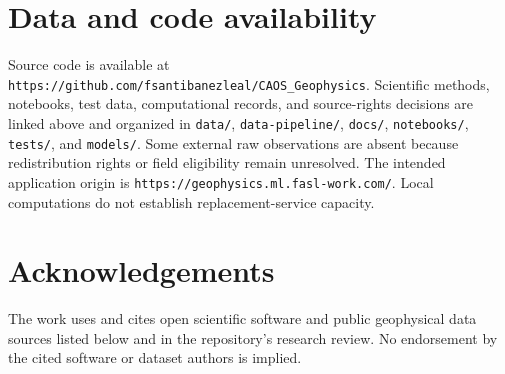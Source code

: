 \section{Data and code availability}\label{data-and-code-availability}

Source code is available at
\texttt{https://github.com/fsantibanezleal/CAOS\_Geophysics}. Scientific
methods, notebooks, test data, computational records, and source-rights
decisions are linked above and organized in \texttt{data/},
\texttt{data-pipeline/}, \texttt{docs/}, \texttt{notebooks/},
\texttt{tests/}, and \texttt{models/}. Some external raw observations
are absent because redistribution rights or field eligibility remain
unresolved. The intended application origin is
\texttt{https://geophysics.ml.fasl-work.com/}. Local computations do not
establish replacement-service capacity.

\section{Acknowledgements}\label{acknowledgements}

The work uses and cites open scientific software and public geophysical
data sources listed below and in the repository's research review. No
endorsement by the cited software or dataset authors is implied.
